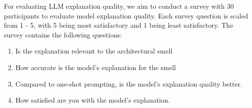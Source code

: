 For evaluating LLM explanation quality, we aim to conduct a survey with
30 participants to evaluate model explanation quality. Each survey question
is scaled from 1 - 5, with 5 being most satisfactory and 1 being least satisfactory.
The survey contains the following questions:
\\

\begin{enumerate}
  \item Is the explanation relevant to the architectural smell
  \item How accurate is the model's explanation for the smell
  \item Compared to one-shot prompting, is the model's explanation quality better.
  \item How satisfied are you with the model's explanation.
\end{enumerate}
